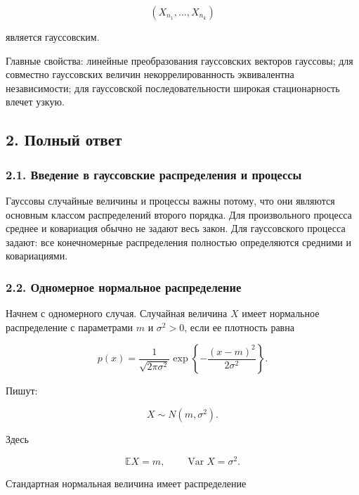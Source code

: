 \documentclass[
  11pt,
  a4paper,
]{article}
\begin{document}
\[
(X_{n_1},\ldots,X_{n_k})
\]

является гауссовским.

Главные свойства: линейные преобразования гауссовских векторов гауссовы;
для совместно гауссовских величин некоррелированность эквивалентна
независимости; для гауссовской последовательности широкая стационарность
влечет узкую.

\subsection{2. Полный
ответ}\label{ux43fux43eux43bux43dux44bux439-ux43eux442ux432ux435ux442}

\subsubsection{2.1. Введение в гауссовские распределения и
процессы}\label{ux432ux432ux435ux434ux435ux43dux438ux435-ux432-ux433ux430ux443ux441ux441ux43eux432ux441ux43aux438ux435-ux440ux430ux441ux43fux440ux435ux434ux435ux43bux435ux43dux438ux44f-ux438-ux43fux440ux43eux446ux435ux441ux441ux44b}

Гауссовы случайные величины и процессы важны потому, что они являются
основным классом распределений второго порядка. Для произвольного
процесса среднее и ковариация обычно не задают весь закон. Для
гауссовского процесса задают: все конечномерные распределения полностью
определяются средними и ковариациями.

\subsubsection{2.2. Одномерное нормальное
распределение}\label{ux43eux434ux43dux43eux43cux435ux440ux43dux43eux435-ux43dux43eux440ux43cux430ux43bux44cux43dux43eux435-ux440ux430ux441ux43fux440ux435ux434ux435ux43bux435ux43dux438ux435}

Начнем с одномерного случая. Случайная величина \(X\) имеет нормальное
распределение с параметрами \(m\) и \(\sigma^2>0\), если ее плотность
равна

\[
p(x)
=
\frac1{\sqrt{2\pi\sigma^2}}
\exp\left\{-\frac{(x-m)^2}{2\sigma^2}\right\}.
\]

Пишут:

\[
X\sim N(m,\sigma^2).
\]

Здесь

\[
\mathbb EX=m,
\qquad
\operatorname{Var}X=\sigma^2.
\]

Стандартная нормальная величина имеет распределение
\end{document}
